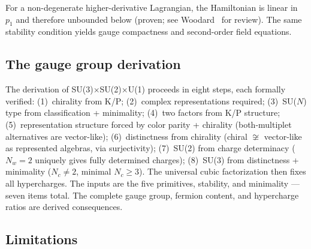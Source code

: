 \documentclass[12pt,a4paper]{article}
\begin{document}
For a non-degenerate higher-derivative Lagrangian, the Hamiltonian is linear in $p_1$ and therefore unbounded below (proven; see Woodard~\cite{woodard} for review). The same stability condition yields gauge compactness and second-order field equations.

\subsection{The gauge group derivation}

The derivation of SU(3)$\times$SU(2)$\times$U(1) proceeds in eight steps, each formally verified: (1)~chirality from K/P; (2)~complex representations required; (3)~SU($N$) type from classification + minimality; (4)~two factors from K/P structure; (5)~representation structure forced by color parity + chirality (both-multiplet alternatives are vector-like); (6)~distinctness from chirality (chiral $\not\cong$ vector-like as represented algebras, via surjectivity); (7)~SU(2) from charge determinacy ($N_w = 2$ uniquely gives fully determined charges); (8)~SU(3) from distinctness + minimality ($N_c \neq 2$, minimal $N_c \geq 3$). The universal cubic factorization then fixes all hypercharges. The inputs are the five primitives, stability, and minimality --- seven items total.  The complete gauge group, fermion content, and hypercharge ratios are derived consequences.

\subsection{Limitations}
\end{document}

